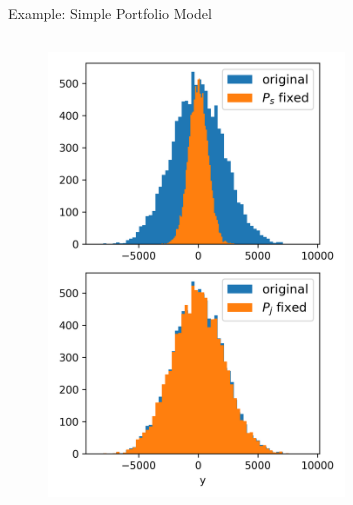 \documentclass[english,aspectratio=169]{beamer}
\begin{document}
\begin{frame}[fragile]{Example: Simple Portfolio Model}
\begin{columns}[T,onlytextwidth]
\begin{column}{0.4\textwidth}
  \begin{figure}
    \centering
    \includegraphics[width=0.7\textwidth]{./figures/portfolio.png}
  \end{figure}
\end{column}

\end{columns}

\end{frame}
\end{document}
